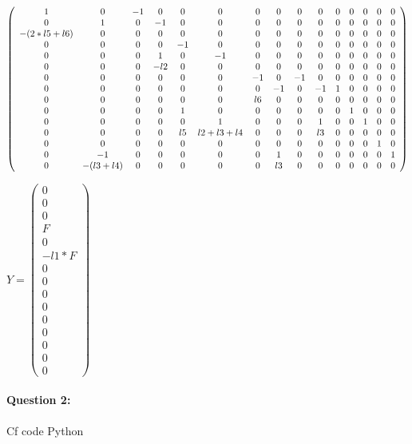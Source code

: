 $\left(\begin{array}{c c c c c c c c c c c c c c c}
1 & 0 & -1 & 0 & 0 & 0 & 0 & 0 & 0 & 0 & 0 & 0 & 0 & 0 & 0 \\
0 & 1 & 0 & -1 & 0 & 0 & 0 & 0 & 0 & 0 & 0 & 0 & 0 & 0 & 0 \\
-(2*l5+l6) & 0 & 0 & 0 & 0 & 0 & 0 & 0 & 0 & 0 & 0 & 0 & 0 & 0 & 0 \\
0 & 0 & 0 & 0 & -1 & 0 & 0 & 0 & 0 & 0 & 0 & 0 & 0 & 0 & 0 \\
0 & 0 & 0 & 1 & 0 & -1 & 0 & 0 & 0 & 0 & 0 & 0 & 0 & 0 & 0 \\
0 & 0 & 0 & -l2 & 0 & 0 & 0 & 0 & 0 & 0 & 0 & 0 & 0 & 0 & 0 \\
0 & 0 & 0 & 0 & 0 & 0 & -1 & 0 & -1 & 0 & 0 & 0 & 0 & 0 & 0 \\
0 & 0 & 0 & 0 & 0 & 0 & 0 & -1 & 0 & -1 & 1 & 0 & 0 & 0 & 0 \\
0 & 0 & 0 & 0 & 0 & 0 & l6 & 0 & 0 & 0 & 0 & 0 & 0 & 0 & 0 \\
0 & 0 & 0 & 0 & 1 & 0 & 0 & 0 & 0 & 0 & 0 & 1 & 0 & 0 & 0 \\
0 & 0 & 0 & 0 & 0 & 1 & 0 & 0 & 0 & 1 & 0 & 0 & 1 & 0 & 0 \\
0 & 0 & 0 & 0 & l5 & l2+l3+l4 & 0 & 0 & 0 & l3 & 0 & 0 & 0 & 0 & 0 \\
0 & 0 & 0 & 0 & 0 & 0 & 0 & 0 & 0 & 0 & 0 & 0 & 0 & 1 & 0 \\
0 & -1 & 0 & 0 & 0 & 0 & 0 & 1 & 0 & 0 & 0 & 0 & 0 & 0 & 1 \\
0 & -(l3+l4) & 0 & 0 & 0 & 0 & 0 & l3 & 0 & 0 & 0 & 0 & 0 & 0 & 0
\end{array}\right)$

$Y=\left(\begin{array}{c}
0 \\ 0 \\ 0 \\ F \\ 0 \\ -l1*F \\ 0 \\ 0 \\ 0 \\ 0 \\ 0 \\ 0 \\ 0 \\ 0 \\ 0\end{array}\right)$

\paragraph{Question 2:} Cf code Python

